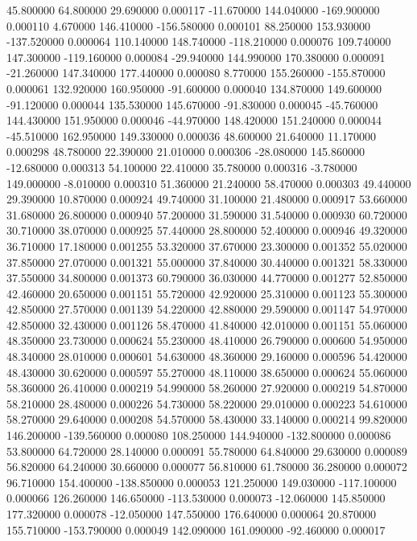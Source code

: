 45.800000 64.800000 29.690000 0.000117 
-11.670000 144.040000 -169.900000 0.000110 
4.670000 146.410000 -156.580000 0.000101 
88.250000 153.930000 -137.520000 0.000064 
110.140000 148.740000 -118.210000 0.000076 
109.740000 147.300000 -119.160000 0.000084 
-29.940000 144.990000 170.380000 0.000091 
-21.260000 147.340000 177.440000 0.000080 
8.770000 155.260000 -155.870000 0.000061 
132.920000 160.950000 -91.600000 0.000040 
134.870000 149.600000 -91.120000 0.000044 
135.530000 145.670000 -91.830000 0.000045 
-45.760000 144.430000 151.950000 0.000046 
-44.970000 148.420000 151.240000 0.000044 
-45.510000 162.950000 149.330000 0.000036 
48.600000 21.640000 11.170000 0.000298 
48.780000 22.390000 21.010000 0.000306 
-28.080000 145.860000 -12.680000 0.000313 
54.100000 22.410000 35.780000 0.000316 
-3.780000 149.000000 -8.010000 0.000310 
51.360000 21.240000 58.470000 0.000303 
49.440000 29.390000 10.870000 0.000924 
49.740000 31.100000 21.480000 0.000917 
53.660000 31.680000 26.800000 0.000940 
57.200000 31.590000 31.540000 0.000930 
60.720000 30.710000 38.070000 0.000925 
57.440000 28.800000 52.400000 0.000946 
49.320000 36.710000 17.180000 0.001255 
53.320000 37.670000 23.300000 0.001352 
55.020000 37.850000 27.070000 0.001321 
55.000000 37.840000 30.440000 0.001321 
58.330000 37.550000 34.800000 0.001373 
60.790000 36.030000 44.770000 0.001277 
52.850000 42.460000 20.650000 0.001151 
55.720000 42.920000 25.310000 0.001123 
55.300000 42.850000 27.570000 0.001139 
54.220000 42.880000 29.590000 0.001147 
54.970000 42.850000 32.430000 0.001126 
58.470000 41.840000 42.010000 0.001151 
55.060000 48.350000 23.730000 0.000624 
55.230000 48.410000 26.790000 0.000600 
54.950000 48.340000 28.010000 0.000601 
54.630000 48.360000 29.160000 0.000596 
54.420000 48.430000 30.620000 0.000597 
55.270000 48.110000 38.650000 0.000624 
55.060000 58.360000 26.410000 0.000219 
54.990000 58.260000 27.920000 0.000219 
54.870000 58.210000 28.480000 0.000226 
54.730000 58.220000 29.010000 0.000223 
54.610000 58.270000 29.640000 0.000208 
54.570000 58.430000 33.140000 0.000214 
99.820000 146.200000 -139.560000 0.000080 
108.250000 144.940000 -132.800000 0.000086 
53.800000 64.720000 28.140000 0.000091 
55.780000 64.840000 29.630000 0.000089 
56.820000 64.240000 30.660000 0.000077 
56.810000 61.780000 36.280000 0.000072 
96.710000 154.400000 -138.850000 0.000053 
121.250000 149.030000 -117.100000 0.000066 
126.260000 146.650000 -113.530000 0.000073 
-12.060000 145.850000 177.320000 0.000078 
-12.050000 147.550000 176.640000 0.000064 
20.870000 155.710000 -153.790000 0.000049 
142.090000 161.090000 -92.460000 0.000017 
